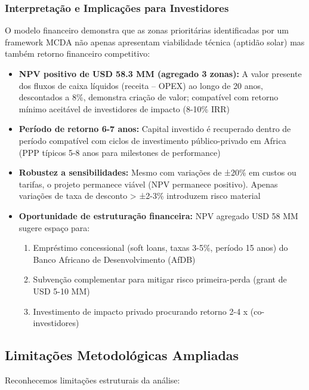\documentclass[12pt, a4paper]{article}
\begin{document}
\subsubsection{Interpretação e Implicações para Investidores}

O modelo financeiro demonstra que as zonas prioritárias identificadas por um framework MCDA não apenas apresentam viabilidade técnica (aptidão solar) mas também retorno financeiro competitivo:

\begin{itemize}
    \item \textbf{NPV positivo de USD 58.3 MM (agregado 3 zonas):} A valor presente dos fluxos de caixa líquidos (receita – OPEX) ao longo de 20 anos, descontados a 8\%, demonstra criação de valor; compatível com retorno mínimo aceitável de investidores de impacto (8-10\% IRR)
    
    \item \textbf{Período de retorno 6-7 anos:} Capital investido é recuperado dentro de período compatível com ciclos de investimento público-privado em Africa (PPP típicos 5-8 anos para milestones de performance)
    
    \item \textbf{Robustez a sensibilidades:} Mesmo com variações de ±20\% em custos ou tarifas, o projeto permanece viável (NPV permanece positivo). Apenas variações de taxa de desconto > ±2-3\% introduzem risco material
    
    \item \textbf{Oportunidade de estruturação financeira:} NPV agregado USD 58 MM sugere espaço para:
        \begin{enumerate}
            \item Empréstimo concessional (soft loans, taxas 3-5\%, período 15 anos) do Banco Africano de Desenvolvimento (AfDB)
            \item Subvenção complementar para mitigar risco primeira-perda (grant de USD 5-10 MM)
            \item Investimento de impacto privado procurando retorno 2-4 x (co-investidores)
        \end{enumerate}
\end{itemize}

\subsection{Limitações Metodológicas Ampliadas}

Reconhecemos limitações estruturais da análise:
\end{document}
